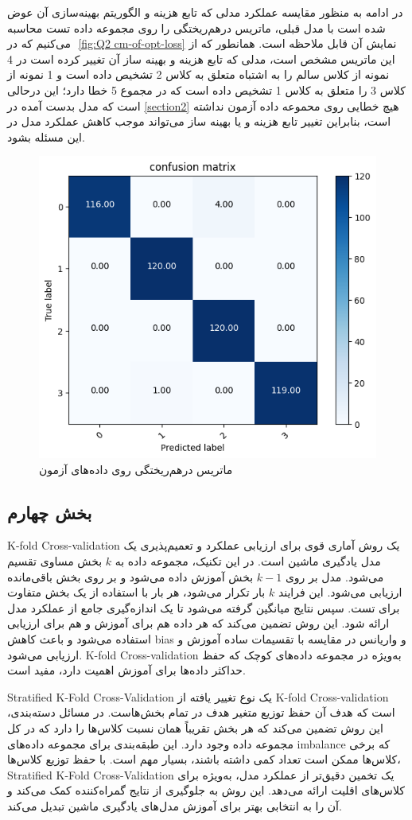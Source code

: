 \documentclass{article}
\begin{document}
در ادامه به منظور مقایسه عملکرد مدلی که تابع هزینه و الگوریتم بهینه‌سازی آن عوض شده است با مدل قبلی، ماتریس درهم‌ریختگی را روی مجموعه داده تست محاسبه می‌کنیم که در ‎
\autoref{fig:Q2 cm-of-opt-loss}
نمایش آن قابل ملاحظه است. همانطور که از این ماتریس مشخص است، مدلی که تابع هزینه و بهینه ساز آن تغییر کرده است در 4 نمونه از کلاس سالم را به اشتباه متعلق به کلاس 2 تشخیص داده است و 1 نمونه از کلاس 3 را متعلق به کلاس 1 تشخیص داده است که در مجموع 5 خطا دارد؛ این درحالی است که مدل بدست آمده در
\autoref{section2}
هیچ خطایی روی محموعه داده آزمون نداشته است، بنابراین تغییر تابع هزینه و یا بهینه ساز می‌تواند موجب کاهش عملکرد مدل در این مسئله بشود.  
\begin{figure}[H]
\centering
\includegraphics[width=0.5\linewidth]{"img/Q2/cm of opt loss"}
\caption{ماتریس درهم‌ریختگی روی داده‌های آزمون}
\label{fig:Q2 cm-of-opt-loss}
\end{figure}

\subsection{بخش چهارم}

K-fold Cross-validation
یک روش آماری قوی برای ارزیابی عملکرد و تعمیم‌پذیری یک مدل یادگیری ماشین است. در این تکنیک، مجموعه داده به \(k\) بخش مساوی تقسیم می‌شود. مدل بر روی \(k-1\) بخش آموزش داده می‌شود و بر روی بخش باقی‌مانده ارزیابی می‌شود. این فرایند \(k\) بار تکرار می‌شود، هر بار با استفاده از یک بخش متفاوت برای تست. سپس نتایج میانگین گرفته می‌شود تا یک اندازه‌گیری جامع از عملکرد مدل ارائه شود. این روش تضمین می‌کند که هر  داده هم برای آموزش و هم برای ارزیابی استفاده می‌شود و باعث کاهش bias و واریانس در مقایسه با تقسیمات ساده آموزش و ارزیابی می‌شود. K-fold Cross-validation به‌ویژه در مجموعه داده‌های کوچک که حفظ حداکثر داده‌ها برای آموزش اهمیت دارد، مفید است.

Stratified K-Fold Cross-Validation
 یک نوع تغییر یافته از K-fold Cross-validation است که هدف آن حفظ توزیع متغیر هدف در تمام بخش‌هاست. در مسائل دسته‌بندی، این روش تضمین می‌کند که هر بخش تقریباً همان نسبت کلاس‌ها را دارد که در کل مجموعه داده وجود دارد. این طبقه‌بندی برای مجموعه داده‌های imbalance که برخی کلاس‌ها ممکن است تعداد کمی داشته باشند، بسیار مهم است. با حفظ توزیع کلاس‌ها، Stratified K-Fold Cross-Validation یک تخمین دقیق‌تر از عملکرد مدل، به‌ویژه برای کلاس‌های اقلیت ارائه می‌دهد. این روش به جلوگیری از نتایج گمراه‌کننده کمک می‌کند و آن را به انتخابی بهتر برای آموزش مدل‌های یادگیری ماشین تبدیل می‌کند.
\end{document}
